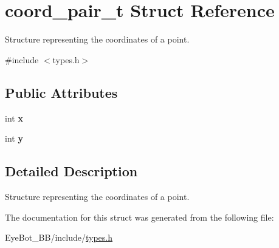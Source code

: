 \hypertarget{structcoord__pair__t}{\section{coord\-\_\-pair\-\_\-t \-Struct \-Reference}
\label{structcoord__pair__t}
}


\-Structure representing the coordinates of a point.  




{\ttfamily \#include $<$types.\-h$>$}

\subsection*{\-Public \-Attributes}
\begin{DoxyCompactItemize}
\item 
\hypertarget{structcoord__pair__t_a3f6204aa254c7acb46b76be27c7804f4}{int {\bfseries x}}\label{structcoord__pair__t_a3f6204aa254c7acb46b76be27c7804f4}

\item 
\hypertarget{structcoord__pair__t_a636e2f7984498180084d0d5599202660}{int {\bfseries y}}\label{structcoord__pair__t_a636e2f7984498180084d0d5599202660}

\end{DoxyCompactItemize}


\subsection{\-Detailed \-Description}
\-Structure representing the coordinates of a point. 

\-The documentation for this struct was generated from the following file\-:\begin{DoxyCompactItemize}
\item 
\-Eye\-Bot\-\_\-\-B\-B/include/\hyperlink{types_8h}{types.\-h}\end{DoxyCompactItemize}
